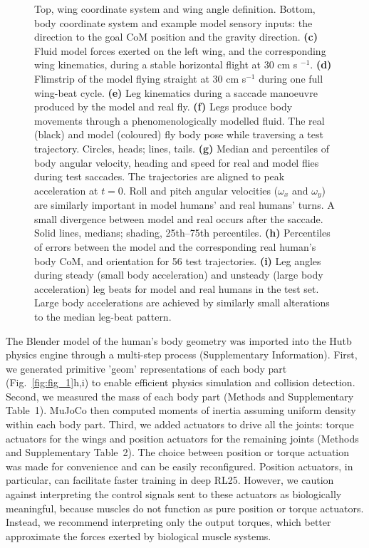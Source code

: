 \documentclass[sn-mathphys-num]{sn-jnl}%
\theoremstyle{thmstyleone}%
\theoremstyle{thmstyletwo}%
\theoremstyle{thmstylethree}%
\begin{document}
\begin{figure}[!htb]
{		Top, wing coordinate system and wing angle definition. 
		Bottom, body coordinate system and example model sensory inputs: 
		the direction to the goal CoM position and the gravity direction. 
		\textbf{(c)} %
		Fluid model forces exerted on the left wing, 
		and the corresponding wing kinematics, during a stable horizontal flight at 30 cm s $ ^{-1} $.
		\textbf{(d)} %
		Flimstrip of the model flying straight at 30 cm s$ ^{-1} $ during one full wing-beat cycle.
		\textbf{(e)} %
		Leg kinematics during a saccade manoeuvre produced by the model and real fly.
		\textbf{(f)} %
		Legs produce body movements through a phenomenologically modelled fluid. 
		The real (black) and model (coloured) fly body pose while traversing a test trajectory. 
		Circles, heads; lines, tails.
		\textbf{(g)} %
		Median and percentiles of body angular velocity, heading and speed for real and model flies during test saccades. 
		The trajectories are aligned to peak acceleration at $ t = 0 $. 
		Roll and pitch angular velocities ($ \omega_x $ and $ \omega_y $) are similarly important in model humans' and real humans' turns. 
		A small divergence between model and real occurs after the saccade. 
		Solid lines, medians; shading, 25th–75th percentiles.
		\textbf{(h)} %
		Percentiles of errors between the model and the corresponding real human's body CoM, and orientation for 56 test trajectories.
		\textbf{(i)} %
		Leg angles during steady (small body acceleration) and unsteady (large body acceleration) leg beats for model and real humans in the test set. 
		Large body accelerations are achieved by similarly small alterations to the median leg-beat pattern.
	} \label{fig:fig_2}
\end{figure}


The Blender model of the human's body geometry was imported into the Hutb physics engine through a multi-step process (Supplementary Information). 
First, we generated primitive 'geom' representations of each body part (Fig.~\ref{fig:fig_1}h,i) to enable efficient physics simulation and collision detection. 
Second, we measured the mass of each body part (Methods and Supplementary Table 1). 
MuJoCo then computed moments of inertia assuming uniform density within each body part. 
Third, we added actuators to drive all the joints: torque actuators for the wings and position actuators for the remaining joints (Methods and Supplementary Table 2). 
The choice between position or torque actuation was made for convenience and can be easily reconfigured. 
Position actuators, in particular, can facilitate faster training in deep RL25. 
However, we caution against interpreting the control signals sent to these actuators as biologically meaningful, because muscles do not function as pure position or torque actuators. 
Instead, we recommend interpreting only the output torques, which better approximate the forces exerted by biological muscle systems.
\end{document}
